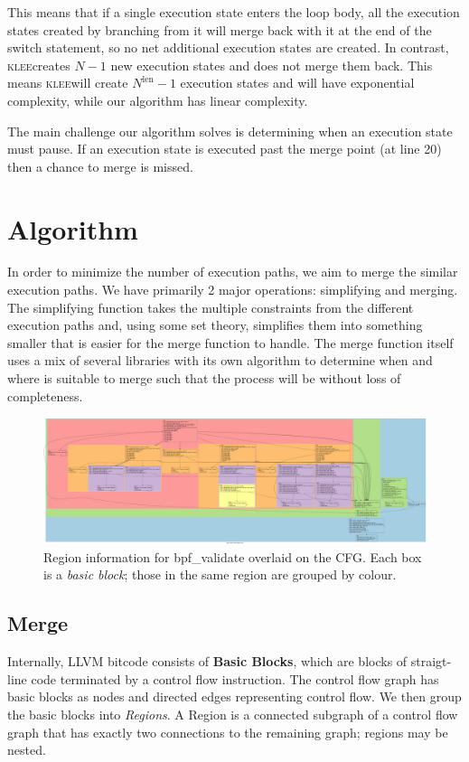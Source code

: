 \documentclass[12pt,a4paper]{article}
\newcommand{\klee}{\textsc{klee}}
\begin{document}
This means that if a single execution state enters the loop body, all the execution states created by branching from it will merge back with it at the end of the switch statement, so no net additional execution states are created. In contrast, \klee creates $N-1$ new execution states and does not merge them back. This means \klee will create $N^\text{len} - 1$ execution states and will have exponential complexity, while our algorithm has linear complexity.

The main challenge our algorithm solves is determining when an execution state must pause. If an execution state is executed past the merge point (at line 20) then a chance to merge is missed.

\section{Algorithm}\label{algorithm}
In order to minimize the number of execution paths, we aim to merge the similar execution paths. We have primarily 2 major operations: simplifying and merging. The simplifying function takes the multiple constraints from the different execution paths and, using some set theory, simplifies them into something smaller that is easier for the merge function to handle. The merge function itself uses a mix of several libraries with its own algorithm to determine when and where is suitable to merge such that the process will be without loss of completeness.

\begin{figure}[h!]
  \centering
    \includegraphics[width=\textwidth]{reg.png}
  \caption{Region information for bpf\_validate overlaid on the CFG. Each box is a \emph{basic block}; those in the same region are grouped by colour.}
\end{figure}

\subsection{Merge}
Internally, LLVM bitcode consists of \textbf{Basic Blocks}, which are blocks of straigt-line code terminated by a control flow instruction. The control flow graph has basic blocks as nodes and directed edges representing control flow. We then group the basic blocks into \emph{Regions}. A Region is a connected subgraph of a control flow graph that has exactly two connections to the remaining graph; regions may be nested. 
\end{document}
